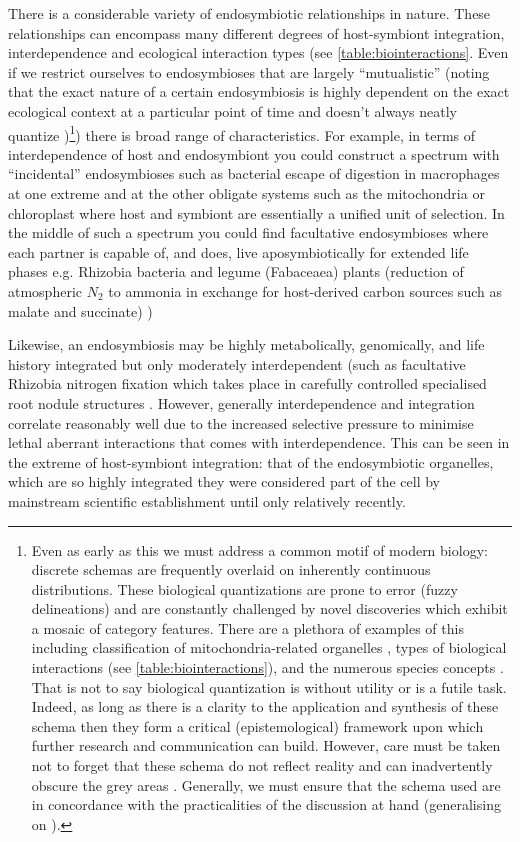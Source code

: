 There is a considerable variety of endosymbiotic relationships in nature. These relationships can encompass many different
degrees of host-symbiont integration, interdependence and ecological interaction types (see \ref{table:biointeractions}.  
Even if we restrict ourselves to endosymbioses that are largely ``mutualistic'' (noting that the exact nature of
a certain endosymbiosis is highly dependent on the exact ecological context at a particular point of time and doesn't
always neatly quantize \citep{Leung2008})\footnote{Even as early as this we 
    must address a common motif of modern biology: discrete schemas are frequently 
    overlaid on inherently continuous distributions.  These biological quantizations are prone to error (fuzzy delineations)
    and are constantly challenged by novel discoveries which exhibit a mosaic of category features.  
    There are a plethora of examples of this including classification of 
    mitochondria-related organelles \citep{Maguire2014}, types of biological interactions 
    (see \ref{table:biointeractions}), and the numerous species concepts \citep{DeQueiroz2007,Boenigk2012}.
    That is not to say biological quantization is without utility or is a futile task.  Indeed, as long as there is a clarity to 
    the application and synthesis of these schema then they form a critical (epistemological) framework upon which further 
    research and communication can build. 
    However, care must be taken not to forget that these schema do not reflect reality and can inadvertently obscure
    the grey areas \citep{Leung2008}.  Generally, we must ensure that the schema used are in concordance with the practicalities of the 
discussion at hand (generalising on \citep{Boenigk2012}).}) there is broad range of characteristics.
For example, in terms of interdependence of host and endosymbiont you could construct a spectrum with ``incidental'' endosymbioses 
such as bacterial escape of digestion in macrophages at one extreme and at the other obligate systems such as the mitochondria or chloroplast 
where host and symbiont are essentially a unified unit of selection.  In the middle of such a spectrum you could find facultative endosymbioses
where each partner is capable of, and does, live aposymbiotically for extended life phases e.g. Rhizobia bacteria and legume (Fabaceaea) plants 
(reduction of atmospheric \(N_{2}\) to ammonia \citep{Hirsch1992} in exchange for host-derived carbon sources such as malate and succinate) \citep{Prell2006})

Likewise, an endosymbiosis may be highly metabolically, genomically, and life history integrated but only moderately interdependent (such as facultative Rhizobia nitrogen fixation which takes place
in carefully controlled specialised root nodule structures \citep{Crespi2008}.  However, generally interdependence and integration correlate reasonably
well due to the increased selective pressure to minimise lethal aberrant interactions that comes with interdependence.  This can be seen 
in the extreme of host-symbiont integration: that of the endosymbiotic organelles, which are so highly integrated they were considered part of the cell by
mainstream scientific establishment until only relatively recently.

